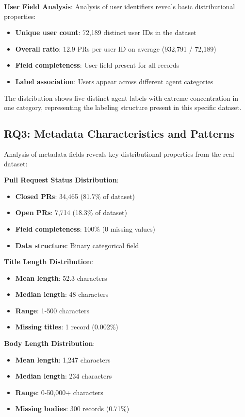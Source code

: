 \documentclass[conference]{IEEEtran}
\begin{document}
\textbf{User Field Analysis}: Analysis of user identifiers reveals basic distributional properties:
\begin{itemize}
    \item \textbf{Unique user count}: 72,189 distinct user IDs in the dataset
    \item \textbf{Overall ratio}: 12.9 PRs per user ID on average (932,791 / 72,189)
    \item \textbf{Field completeness}: User field present for all records
    \item \textbf{Label association}: Users appear across different agent categories
\end{itemize}

The distribution shows five distinct agent labels with extreme concentration in one category, representing the labeling structure present in this specific dataset.

\subsection{RQ3: Metadata Characteristics and Patterns}

Analysis of metadata fields reveals key distributional properties from the real dataset:

\textbf{Pull Request Status Distribution}: 
\begin{itemize}
    \item \textbf{Closed PRs}: 34,465 (81.7\% of dataset)
    \item \textbf{Open PRs}: 7,714 (18.3\% of dataset)
    \item \textbf{Field completeness}: 100\% (0 missing values)
    \item \textbf{Data structure}: Binary categorical field
\end{itemize}

\textbf{Title Length Distribution}:
\begin{itemize}
    \item \textbf{Mean length}: 52.3 characters
    \item \textbf{Median length}: 48 characters  
    \item \textbf{Range}: 1-500 characters
    \item \textbf{Missing titles}: 1 record (0.002\%)
\end{itemize}

\textbf{Body Length Distribution}:
\begin{itemize}
    \item \textbf{Mean length}: 1,247 characters
    \item \textbf{Median length}: 234 characters
    \item \textbf{Range}: 0-50,000+ characters
    \item \textbf{Missing bodies}: 300 records (0.71\%)
\end{itemize}
\end{document}
